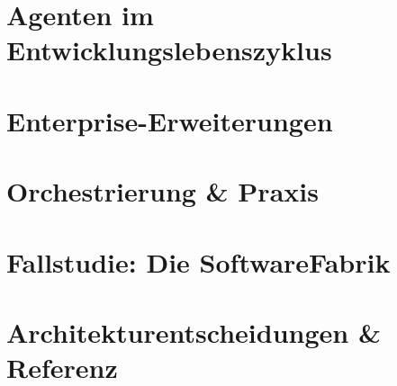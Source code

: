 \documentclass[11pt,a4paper,ngerman]{scrreprt}
\begin{document}
\part{Agenten im Entwicklungslebenszyklus}


\part{Enterprise-Erweiterungen}






\part{Orchestrierung \& Praxis}




\part{Fallstudie: Die SoftwareFabrik}


\part{Architekturentscheidungen \& Referenz}






\printbibliography
\end{document}

